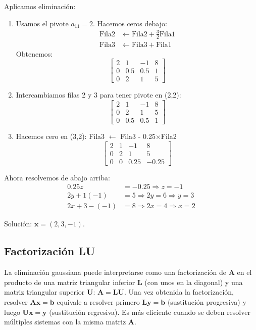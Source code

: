 \documentclass[12pt,a4paper,openany,oneside]{book}
\begin{document}
Aplicamos eliminación:
\begin{enumerate}
    \item Usamos el pivote $a_{11}=2$. Hacemos ceros debajo:
        \begin{align*}
            \text{Fila2} &\leftarrow \text{Fila2} + \frac{3}{2}\text{Fila1} \\
            \text{Fila3} &\leftarrow \text{Fila3} + \text{Fila1}
        \end{align*}
    Obtenemos:
    \[
    \left[\begin{array}{ccc|c}
    2 & 1 & -1 & 8 \\
    0 & 0.5 & 0.5 & 1 \\
    0 & 2 & 1 & 5
    \end{array}\right]
    \]
    \item Intercambiamos filas 2 y 3 para tener pivote en (2,2):
    \[
    \left[\begin{array}{ccc|c}
    2 & 1 & -1 & 8 \\
    0 & 2 & 1 & 5 \\
    0 & 0.5 & 0.5 & 1
    \end{array}\right]
    \]
    \item Hacemos cero en (3,2): Fila3 $\leftarrow$ Fila3 - 0.25$\times$Fila2
    \[
    \left[\begin{array}{ccc|c}
    2 & 1 & -1 & 8 \\
    0 & 2 & 1 & 5 \\
    0 & 0 & 0.25 & -0.25
    \end{array}\right]
    \]
\end{enumerate}

Ahora resolvemos de abajo arriba:
\begin{align*}
0.25 z &= -0.25 \Rightarrow z = -1 \\
2y + 1(-1) &= 5 \Rightarrow 2y = 6 \Rightarrow y = 3 \\
2x + 3 - (-1) &= 8 \Rightarrow 2x = 4 \Rightarrow x = 2
\end{align*}

Solución: $\mathbf{x} = (2,3,-1)$.

\subsection{Factorización LU}
La eliminación gaussiana puede interpretarse como una factorización de $\mathbf{A}$ en el producto de una matriz triangular inferior $\mathbf{L}$ (con unos en la diagonal) y una matriz triangular superior $\mathbf{U}$: $\mathbf{A} = \mathbf{L}\mathbf{U}$. Una vez obtenida la factorización, resolver $\mathbf{A}\mathbf{x} = \mathbf{b}$ equivale a resolver primero $\mathbf{L}\mathbf{y} = \mathbf{b}$ (sustitución progresiva) y luego $\mathbf{U}\mathbf{x} = \mathbf{y}$ (sustitución regresiva). Es más eficiente cuando se deben resolver múltiples sistemas con la misma matriz $\mathbf{A}$.
\end{document}
